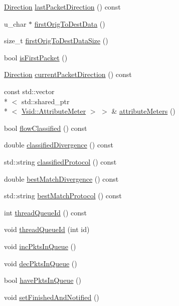 \begin{DoxyCompactItemize}
\item 
\hyperlink{class_vsid_common_1_1_flow_a82b0cd313a915325b97133fd8e104781}{Direction} \hyperlink{class_vsid_common_1_1_flow_a3a2a19ce10910e74f43a196ab65f6cd9}{last\-Packet\-Direction} () const 
\item 
u\-\_\-char $\ast$ \hyperlink{class_vsid_common_1_1_flow_abbfbe66b1dc54b0ac83b029b052fb3e1}{first\-Orig\-To\-Dest\-Data} ()
\item 
size\-\_\-t \hyperlink{class_vsid_common_1_1_flow_aa722f9053c928770e90d689b5d517ec9}{first\-Orig\-To\-Dest\-Data\-Size} ()
\item 
bool \hyperlink{class_vsid_common_1_1_flow_ae437ae88fb48d6ac2880f40fc88195da}{is\-First\-Packet} ()
\item 
\hyperlink{class_vsid_common_1_1_flow_a82b0cd313a915325b97133fd8e104781}{Direction} \hyperlink{class_vsid_common_1_1_flow_a0eb1c59e966ceb9ad6fee05d4c4784ad}{current\-Packet\-Direction} () const 
\item 
const std\-::vector\\*
$<$ std\-::shared\-\_\-ptr\\*
$<$ \hyperlink{class_vsid_1_1_attribute_meter}{Vsid\-::\-Attribute\-Meter} $>$ $>$ \& \hyperlink{class_vsid_common_1_1_flow_aa44a2ba1dfa16eee8f658e2ed7e0c1a4}{attribute\-Meters} ()
\item 
bool \hyperlink{class_vsid_common_1_1_flow_a47272e1d764ab23dee120592dd5010eb}{flow\-Classified} () const 
\item 
double \hyperlink{class_vsid_common_1_1_flow_a19a937ddd4c131b0576a5ff5ef558ec3}{classified\-Divergence} () const 
\item 
std\-::string \hyperlink{class_vsid_common_1_1_flow_a586c8f4c897090c7e133c5eee609dc77}{classified\-Protocol} () const 
\item 
double \hyperlink{class_vsid_common_1_1_flow_a1204dc8ab9fd2e9cc04a5d7118aa0bb1}{best\-Match\-Divergence} () const 
\item 
std\-::string \hyperlink{class_vsid_common_1_1_flow_ac209c90694eb55a4c2c93b0812f68080}{best\-Match\-Protocol} () const 
\item 
int \hyperlink{class_vsid_common_1_1_flow_a067c4a0fbf63c7295442c54898d9990d}{thread\-Queue\-Id} () const 
\item 
void \hyperlink{class_vsid_common_1_1_flow_a8bcd68ca197bf35b4655418ee72be9ad}{thread\-Queue\-Id} (int id)
\item 
void \hyperlink{class_vsid_common_1_1_flow_ab9d600f88c2db0a8a8faebe4cdfe5731}{inc\-Pkts\-In\-Queue} ()
\item 
void \hyperlink{class_vsid_common_1_1_flow_aa831199b27b8f9e73cb406f9a1bdcec5}{dec\-Pkts\-In\-Queue} ()
\item 
bool \hyperlink{class_vsid_common_1_1_flow_ae0497c1d26c120c088994fdb7643ead0}{have\-Pkts\-In\-Queue} ()
\item 
void \hyperlink{class_vsid_common_1_1_flow_a8deeaf4162dcc7ab1b3bfe43a60e30ec}{set\-Finished\-And\-Notified} ()
\end{DoxyCompactItemize}
